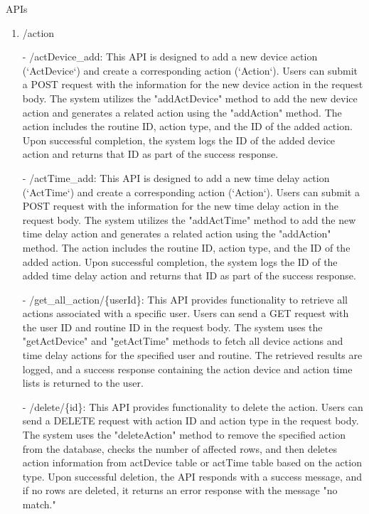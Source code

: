 \item APIs
\begin{enumerate}
    \item /action
    \item[-] /actDevice\_add: This API is designed to add a new device action (`ActDevice`) and create a corresponding action (`Action`). Users can submit a POST request with the information for the new device action in the request body. The system utilizes the "addActDevice" method to add the new device action and generates a related action using the "addAction" method. The action includes the routine ID, action type, and the ID of the added action. Upon successful completion, the system logs the ID of the added device action and returns that ID as part of the success response.\\
    \item[-] /actTime\_add: This API is designed to add a new time delay action (`ActTime`) and create a corresponding action (`Action`). Users can submit a POST request with the information for the new time delay action in the request body. The system utilizes the "addActTime" method to add the new time delay action and generates a related action using the "addAction" method. The action includes the routine ID, action type, and the ID of the added action. Upon successful completion, the system logs the ID of the added time delay action and returns that ID as part of the success response.\\
    \item[-] /get\_all\_action/\{userId\}: This API provides functionality to retrieve all actions associated with a specific user. Users can send a GET request with the user ID and routine ID in the request body. The system uses the "getActDevice" and "getActTime" methods to fetch all device actions and time delay actions for the specified user and routine. The retrieved results are logged, and a success response containing the action device and action time lists is returned to the user.\\
    \item[-] /delete/\{id\}: This API provides functionality to delete the action. Users can send a DELETE request with action ID and action type in the request body. The system uses the "deleteAction" method to remove the specified action from the database, checks the number of affected rows, and then deletes action information from actDevice table or actTime table based on the action type. Upon successful deletion, the API responds with a success message, and if no rows are deleted, it returns an error response with the message "no match."\\

\end{enumerate}
